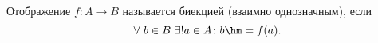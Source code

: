 
    Отображение $f\colon A\to B$ называется биекцией (взаимно однозначным), если
    \[
        \forall\  b\in B\ \exists!a\in A\colon b\hm=f(a).
    \]

